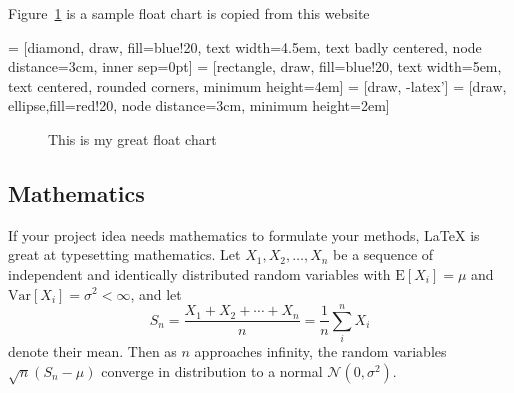 %
%

Figure~\ref{fig:fig3} is a sample float chart is copied from this website \cite{floatchart}

 = [diamond, draw, fill=blue!20, 
    text width=4.5em, text badly centered, node distance=3cm, inner sep=0pt]
 = [rectangle, draw, fill=blue!20, 
    text width=5em, text centered, rounded corners, minimum height=4em]
 = [draw, -latex']
 = [draw, ellipse,fill=red!20, node distance=3cm,
    minimum height=2em]
   
  \begin{figure}[!ht]
 \centering
 

  \caption{\label{fig:fig3}This is my great float chart}
  
  \end{figure}



\subsection{Mathematics}

If your project idea needs mathematics to formulate your methods, \LaTeX{} is great at typesetting mathematics. Let $X_1, X_2, \ldots, X_n$ be a sequence of independent and identically distributed random variables with $\text{E}[X_i] = \mu$ and $\text{Var}[X_i] = \sigma^2 < \infty$, and let
$$S_n = \frac{X_1 + X_2 + \cdots + X_n}{n}
      = \frac{1}{n}\sum_{i}^{n} X_i$$
denote their mean. Then as $n$ approaches infinity, the random variables $\sqrt{n}(S_n - \mu)$ converge in distribution to a normal $\mathcal{N}(0, \sigma^2)$.
